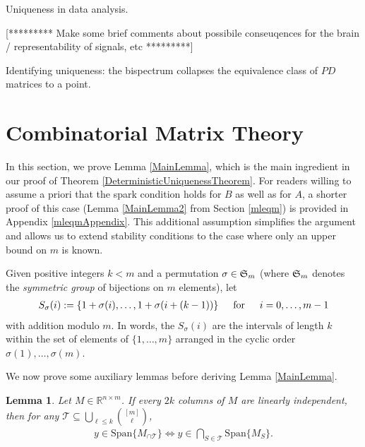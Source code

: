 \documentclass[journal, onecolumn]{IEEEtran}
\newtheorem{lemma}{Lemma}
\begin{document}
Uniqueness in data analysis.

[********* Make some brief comments about possibile conseuqences for the brain / representability of signals, etc *********]


Identifying uniqueness: the bispectrum collapses the equivalence class of $PD$ matrices to a point.


\appendices
\section{Combinatorial Matrix Theory}\label{appendixA}

In this section, we prove Lemma \ref{MainLemma}, which is the main ingredient in our proof of Theorem \ref{DeterministicUniquenessTheorem}. For readers willing to assume a priori that the spark condition holds for $B$ as well as for $A$, a shorter proof of this case (Lemma \ref{MainLemma2} from Section \ref{mleqm}) is provided in Appendix \ref{mleqmAppendix}. This additional assumption simplifies the argument and allows us to extend stability conditions to the case where only an upper bound on $m$ is known. 

Given positive integers $k < m$ and a permutation $\sigma \in \frak{S}_m$ (where $\frak{S}_m$ denotes the \textit{symmetric group} of bijections on $m$ elements), let
\begin{align}
S_\sigma(i) := \{1+\sigma(i), \ldots, 1+\sigma(i + (k-1)) \} \indent \text{for} \indent i = 0, \ldots, m-1
\end{align}
%
with addition modulo $m$. In words, the $S_\sigma(i)$ are the intervals of length $k$ within the set of elements of $\{1, \ldots, m\}$ arranged in the cyclic order $\sigma(1), \ldots, \sigma(m)$.

We now prove some auxiliary lemmas before deriving Lemma \ref{MainLemma}.


\begin{lemma}\label{SpanIntersectionLemma}
Let $M \in \mathbb{R}^{n \times m}$. If every $2k$ columns of $M$ are linearly independent, then for any $\mathcal{T} \subseteq \bigcup_{\ell \leq k} {[m] \choose \ell}$,
\begin{align}
y \in \text{Span}\{M_{\cap \mathcal{T}}\}  \Longleftrightarrow y \in \bigcap_{S \in \mathcal{T}} \text{Span}\{M_S\}.
\end{align}
\end{lemma}
\end{document}
